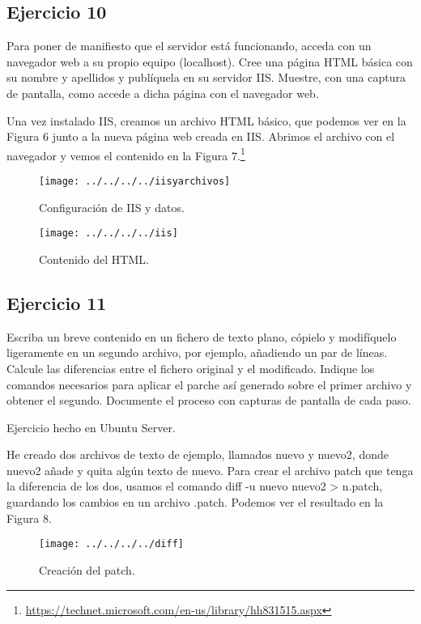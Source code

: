 \documentclass[a4paper, 11pt]{article} %
\begin{document}
\subsection{Ejercicio 10}
Para poner de manifiesto que el servidor está funcionando, acceda con un navegador web a su propio equipo (localhost). Cree una página HTML básica con su nombre y apellidos y publíquela en su servidor IIS. Muestre, con una captura de pantalla, como accede a dicha página con el navegador web.

Una vez instalado IIS, creamos un archivo HTML básico, que podemos ver en la Figura 6 junto a la nueva página web creada en IIS. Abrimos el archivo con el navegador y vemos el contenido en la Figura 7.\footnote{\url{https://technet.microsoft.com/en-us/library/hh831515.aspx}}

\begin{figure}[htpb]
\texttt{[image: ../../../../iisyarchivos]}
\caption{Configuración de IIS y datos.}
\end{figure}

\pagebreak

\begin{figure}[htpb]
\texttt{[image: ../../../../iis]}
\caption{Contenido del HTML.}
\end{figure}

\pagebreak

\subsection{Ejercicio 11}
Escriba un breve contenido en un fichero de texto plano, cópielo y modifíquelo ligeramente en un segundo archivo, por ejemplo, añadiendo un par de líneas. Calcule las diferencias entre el fichero original y el modificado. Indique los comandos necesarios para aplicar el parche así generado sobre el primer archivo y obtener el segundo. Documente el proceso con capturas de pantalla de cada paso.

Ejercicio hecho en Ubuntu Server. 

He creado dos archivos de texto de ejemplo, llamados nuevo y nuevo2, donde nuevo2 añade y quita algún texto de nuevo. Para crear el archivo patch que tenga la diferencia de los dos, usamos el comando diff -u nuevo nuevo2 > n.patch, guardando los cambios en un archivo .patch. Podemos ver el resultado en la Figura 8. 

\begin{figure}[htpb]
\texttt{[image: ../../../../diff]}
\caption{Creación del patch.}
\end{figure}
\end{document}
